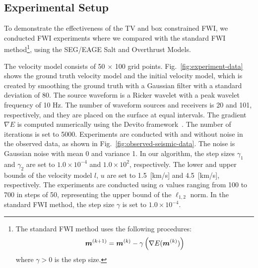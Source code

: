 


\subsection{Experimental Setup} \label{subsec:experimental-setup}

To demonstrate the effectiveness of the TV and box constrained FWI, we conducted FWI experiments where we compared with the standard FWI method\footnote{
    \begin{minipage}{0.95\linewidth}
        The standard FWI method uses the following procedures:
        \begin{equation}
            \FWIWithGradient \label{eq:FWIWithGradient}
        \end{equation}
        where $\gamma > 0$ is the step size.
    \end{minipage}
}\cite{FWI0}, using the SEG/EAGE Salt and Overthrust Models.

The velocity model consists of 50 $\times$ 100 grid points.
Fig.~\ref{fig:experiment-data} shows the ground truth velocity model and the initial velocity model, which is created by smoothing the ground truth with a Gaussian filter with a standard deviation of 80.
The source waveform is a Ricker wavelet with a peak wavelet frequency of 10 Hz.
The number of waveform sources and receivers is 20 and 101, respectively, and they are placed on the surface at equal intervals.
The gradient $\nabla E$ is computed numerically using the Devito framework~\cite{devito}.
The number of iterations is set to 5000.
Experiments are conducted with and without noise in the observed data, as shown in Fig.~\ref{fig:observed-seismic-data}.
The noise is Gaussian noise with mean 0 and variance 1.
In our algorithm, the step sizes $\gamma_1$ and $\gamma_2$ are set to $1.0 \times 10^{-4}$ and $1.0 \times 10^2$, respectively.
The lower and upper bounds of the velocity model $l$, $u$ are set to 1.5~[km/s] and 4.5~[km/s], respectively.
The experiments are conducted using $\alpha$ values ranging from 100 to 700 in steps of 50, representing the upper bound of the $\ell_{1,2}$ norm.
In the standard FWI method, the step size $\gamma$ is set to $1.0 \times 10^{-4}$.








